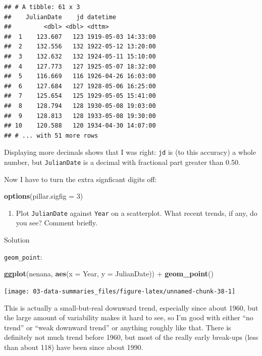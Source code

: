 \documentclass[]{tufte-book}
\newenvironment{Shaded}{}{}
\newcommand{\DataTypeTok}[1]{\textcolor[rgb]{0.56,0.13,0.00}{#1}}
\newcommand{\DecValTok}[1]{\textcolor[rgb]{0.25,0.63,0.44}{#1}}
\newcommand{\KeywordTok}[1]{\textcolor[rgb]{0.00,0.44,0.13}{\textbf{#1}}}
\newcommand{\NormalTok}[1]{#1}
\newcommand{\OperatorTok}[1]{\textcolor[rgb]{0.40,0.40,0.40}{#1}}
\newcommand{\StringTok}[1]{\textcolor[rgb]{0.25,0.44,0.63}{#1}}
\providecommand{\tightlist}{%
  \setlength{\itemsep}{0pt}\setlength{\parskip}{0pt}}
\theoremstyle{definition}
\theoremstyle{definition}
\theoremstyle{definition}
\theoremstyle{remark}
\begin{document}
\begin{verbatim}
## # A tibble: 61 x 3
##    JulianDate    jd datetime           
##         <dbl> <dbl> <dttm>             
##  1    123.607   123 1919-05-03 14:33:00
##  2    132.556   132 1922-05-12 13:20:00
##  3    132.632   132 1924-05-11 15:10:00
##  4    127.773   127 1925-05-07 18:32:00
##  5    116.669   116 1926-04-26 16:03:00
##  6    127.684   127 1928-05-06 16:25:00
##  7    125.654   125 1929-05-05 15:41:00
##  8    128.794   128 1930-05-08 19:03:00
##  9    128.813   128 1933-05-08 19:30:00
## 10    120.588   120 1934-04-30 14:07:00
## # ... with 51 more rows
\end{verbatim}

Displaying more decimals shows that I was right: \texttt{jd} is (to this
accuracy) a whole number, but \texttt{JulianDate} is a decimal with
fractional part greater than 0.50.

Now I have to turn the extra signficant digits off:

\begin{Shaded}
\begin{Highlighting}[]
\KeywordTok{options}\NormalTok{(}\DataTypeTok{pillar.sigfig =} \DecValTok{3}\NormalTok{)}
\end{Highlighting}
\end{Shaded}

\begin{enumerate}
\def\labelenumi{(\alph{enumi})}
\setcounter{enumi}{3}
\tightlist
\item
  Plot \texttt{JulianDate} against \texttt{Year} on a scatterplot. What
  recent trends, if any, do you see? Comment briefly.
\end{enumerate}

Solution

\texttt{geom\_point}:

\begin{Shaded}
\begin{Highlighting}[]
\KeywordTok{ggplot}\NormalTok{(nenana, }\KeywordTok{aes}\NormalTok{(}\DataTypeTok{x =}\NormalTok{ Year, }\DataTypeTok{y =}\NormalTok{ JulianDate)) }\OperatorTok{+}\StringTok{ }
\StringTok{    }\KeywordTok{geom_point}\NormalTok{()}
\end{Highlighting}
\end{Shaded}

\texttt{[image: 03-data-summaries\_files/figure-latex/unnamed-chunk-38-1]}

This is actually a small-but-real downward trend, especially since about
1960, but the large amount of variability makes it hard to see, so I'm
good with either ``no trend'' or ``weak downward trend'' or anything
roughly like that. There is definitely not much trend before 1960, but
most of the really early break-ups (less than about 118) have been since
about 1990.
\end{document}
